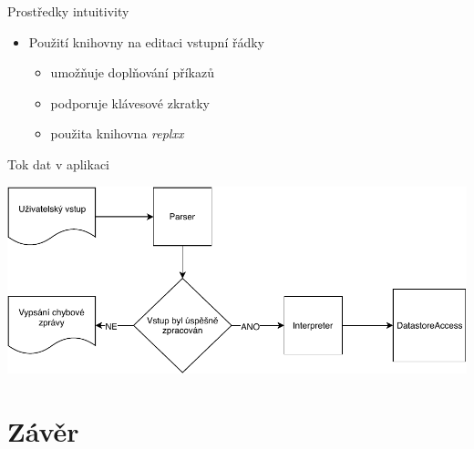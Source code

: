 \documentclass[czech,aspectratio=169]{beamer}
\begin{document}
\begin{frame}{Prostředky intuitivity}
    \begin{itemize}
        \pause{}
        \item[] Použití knihovny na editaci vstupní řádky
            \pause{}
            \begin{itemize}
                \item umožňuje doplňování příkazů
                \pause{}
                \item podporuje klávesové zkratky
                \pause{}
                \item použita knihovna \textit{replxx}
            \end{itemize}
    \end{itemize}
\end{frame}

\begin{frame}{Tok dat v aplikaci}
\begin{center}
    \includegraphics[width=.9\textwidth]{diagram}
\end{center}
\end{frame}

\section{Závěr}
\end{document}
